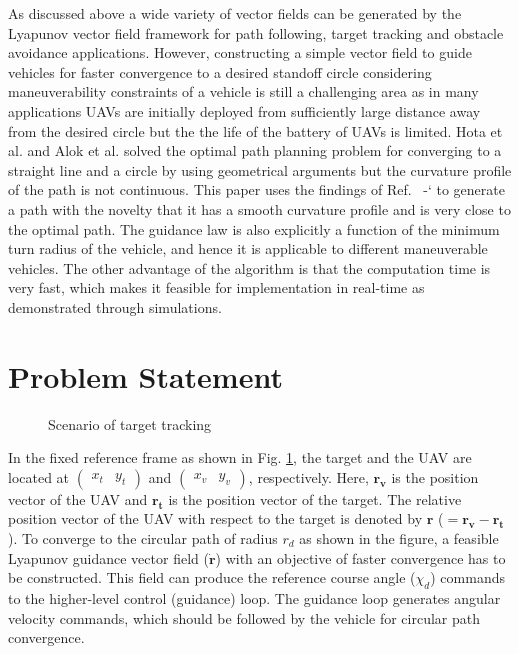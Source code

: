 \documentclass[Afour,sagev,times]{sagej}
\newcommand*{\citen}[1]{%
  \begingroup
    \romannumeral-`\x %
    \setcitestyle{numbers}%
    \cite{#1}%
  \endgroup   
}
\begin{document}
As discussed above a  wide variety of vector fields can be generated by the Lyapunov vector field framework for path following, target tracking and obstacle avoidance \cite{wilhelm2019vector, zhu2019evaluation} applications. However, constructing a simple vector field to guide vehicles for faster convergence to a desired standoff circle considering maneuverability constraints of a vehicle is still a challenging area as in many applications UAVs are initially deployed from sufficiently large distance away from the desired circle but the  the life of the battery of UAVs is limited. Hota et al. \cite{hota2009modified} and Alok et al. \cite{ranjanatime} solved the optimal path planning problem for converging to a straight line and a circle by using geometrical arguments but the curvature profile of the path is not continuous. This paper uses the findings of Ref.~\citen{ranjanatime} to generate a path with the novelty that it has a smooth curvature profile and is very close to the optimal path. The guidance law is also explicitly a function of the minimum turn radius of the vehicle, and hence it is applicable to different maneuverable vehicles. The other advantage of the algorithm is that the computation time is very fast, which makes it feasible for implementation in real-time as demonstrated through simulations.

\section{Problem Statement}

\begin{figure}[h]
	\centering
	\caption{Scenario of target tracking}
	\label{fig:geometry}
\end{figure}

In the fixed reference frame as shown in Fig. \ref{fig:geometry}, the target and the UAV are located at $\begin{pmatrix}
	x_{t} & y_{t}
\end{pmatrix}$ and $\begin{pmatrix}
x_{v} & y_{v}
\end{pmatrix}$, respectively. Here, $\boldsymbol{r_{v}}$ is the position vector of the UAV and $\boldsymbol{r_{t}}$  is the position vector of the target. The relative position vector of the UAV with respect to the target is denoted by $\boldsymbol{r}$  ($=\boldsymbol{r_{v}}-\boldsymbol{r_{t}}$). To converge to the circular path of radius $r_{d}$ as shown in the figure, a feasible Lyapunov guidance vector field ($\dot{\boldsymbol{r}}$) with an objective of faster convergence has to be constructed. This field can produce the reference course angle ($\chi_{d}$) commands to the higher-level control (guidance) loop. The guidance loop generates angular velocity commands, which should be followed by the vehicle for circular path convergence.
\end{document}
